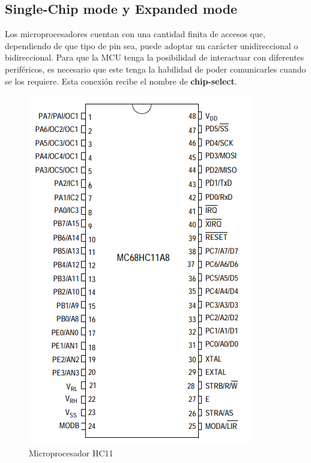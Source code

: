 



\subsection{Single-Chip mode y Expanded mode}
Los microprocesadores cuentan con una cantidad finita de accesos que, dependiendo de que tipo de pin sea, puede adoptar un carácter unidireccional o bidireccional. Para que la MCU tenga la posibilidad de interactuar con diferentes periféricos, es necesario que este tenga la habilidad de poder comunicarles cuando se los requiere. Esta conexión recibe el nombre de \textbf{chip-select}.

\begin{figure}[H]
	\centering
	\includegraphics[scale=0.4]{ImagenesEjercicio3/MicroHC11}
	\caption{Microprocesador HC11}
	\label{fig:microhc11}
\end{figure}

